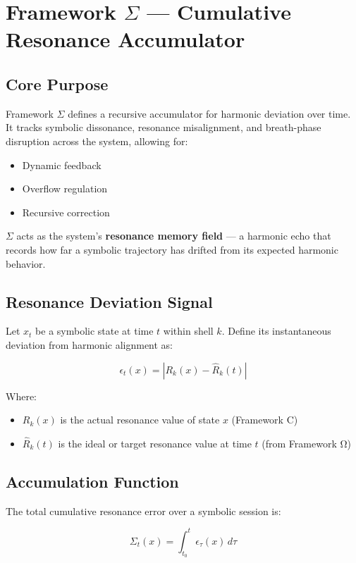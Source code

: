 \section*{Framework $\Sigma$ — Cumulative Resonance Accumulator}

\subsection*{Core Purpose}

Framework $\Sigma$ defines a recursive accumulator for harmonic deviation over time. It tracks symbolic dissonance, resonance misalignment, and breath-phase disruption across the system, allowing for:
\begin{itemize}
  \item Dynamic feedback
  \item Overflow regulation
  \item Recursive correction
\end{itemize}

$\Sigma$ acts as the system’s \textbf{resonance memory field} — a harmonic echo that records how far a symbolic trajectory has drifted from its expected harmonic behavior.

\subsection*{Resonance Deviation Signal}

Let $x_t$ be a symbolic state at time $t$ within shell $k$. Define its instantaneous deviation from harmonic alignment as:

\[
\epsilon_t(x) = |R_k(x) - \hat{R}_k(t)|
\]

Where:
\begin{itemize}
  \item $R_k(x)$ is the actual resonance value of state $x$ (Framework C)
  \item $\hat{R}_k(t)$ is the ideal or target resonance value at time $t$ (from Framework Ω)
\end{itemize}

\subsection*{Accumulation Function}

The total cumulative resonance error over a symbolic session is:

\[
\Sigma_t(x) = \int_{t_0}^{t} \epsilon_\tau(x) \, d\tau
\]

